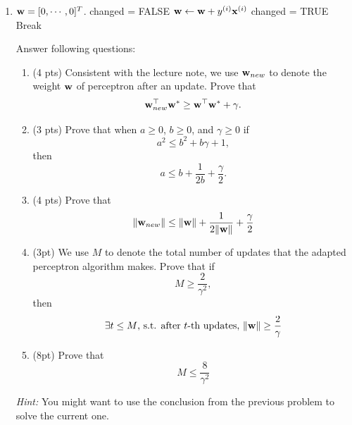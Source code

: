 \documentclass{article}
\newcommand{\yup}[1]{y^{({#1})}}
\theoremstyle{definition}
\theoremstyle{remark}
\newenvironment{Q}
        {%
          \clearpage
          \item
        }
        {%
          \phantom{s} 
          \bigskip
        }
\begin{document}
\begin{enumerate}[font={\Large\bfseries},left=0pt]
\begin{Q}
\begin{enumerate}
\begin{algorithm}
\begin{algorithmic}[1]
     ${\bf w} = [0, \cdots, 0]^T$.
        \STATE changed = FALSE
                \STATE ${\bf w} \leftarrow {\bf w} +  \yup{i}{\bf x}^{(i)}$
                \STATE changed = TRUE
            \ENDIF
        \ENDFOR
            \STATE Break
        \ENDIF
    \ENDWHILE
    
    \end{algorithmic}
    \end{algorithm}

      
    Answer following questions:

    \begin{enumerate}
        \item (4 pts) Consistent with the lecture note, we use ${\bf w}_{new}$ to denote the weight ${\bf w}$ of perceptron after an update.  Prove that $${\bf w}_{new}^\top{\bf w}^*\geq {\bf w}^\top{\bf w}^*+\gamma.$$ 
        \item (3 pts) Prove that when $a \geq 0$, $b \geq 0$, and $\gamma \geq 0$ if 
\[
a^2 \leq b^2 + b\gamma + 1,
\]
then
\[
a \leq b + \frac{1}{2b} + \frac{\gamma}{2}.
\] 
        \item (4 pts) Prove that
        $$
            \|{\bf w}_{new}\|\leq\|{\bf w}\|+\frac{1}{2\|{\bf w}\|}+\frac{\gamma}{2}
        $$ 
        \item  (3pt) We use $M$ to denote the total number of updates that the adapted perceptron algorithm makes. Prove that if $$M\geq\frac{2}{\gamma^2},$$ then
        $$
            \exists t\leq M\text{, s.t. after $t$-th updates, } \|{\bf w}\|\geq\frac{2}{\gamma}
        $$
        \item  (8pt) Prove that 
        $$
            M \leq \frac{8}{\gamma^2}
        $$ 
    \end{enumerate}
    \textit{Hint: }You might want to use the conclusion from the previous problem to solve the current one.
    


\end{enumerate}
\end{Q}


\end{enumerate}
\end{document}
